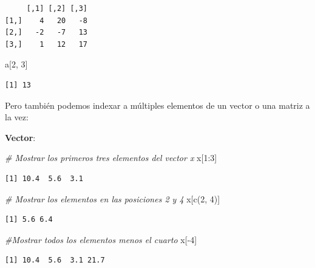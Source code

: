 \documentclass[
]{book}
\newenvironment{Shaded}{\begin{snugshade}}{\end{snugshade}}
\newcommand{\CommentTok}[1]{\textcolor[rgb]{0.56,0.35,0.01}{\textit{#1}}}
\newcommand{\DecValTok}[1]{\textcolor[rgb]{0.00,0.00,0.81}{#1}}
\newcommand{\FunctionTok}[1]{\textcolor[rgb]{0.00,0.00,0.00}{#1}}
\newcommand{\NormalTok}[1]{#1}
\newcommand{\SpecialCharTok}[1]{\textcolor[rgb]{0.00,0.00,0.00}{#1}}
\begin{document}
\begin{verbatim}
     [,1] [,2] [,3]
[1,]    4   20   -8
[2,]   -2   -7   13
[3,]    1   12   17
\end{verbatim}

\begin{Shaded}
\begin{Highlighting}[]
\NormalTok{a[}\DecValTok{2}\NormalTok{, }\DecValTok{3}\NormalTok{]}
\end{Highlighting}
\end{Shaded}

\begin{verbatim}
[1] 13
\end{verbatim}

Pero también podemos indexar a múltiples elementos de un vector o una matriz a la vez:

\textbf{Vector}:

\begin{Shaded}
\begin{Highlighting}[]
\CommentTok{\# Mostrar los primeros tres elementos del vector x}
\NormalTok{x[}\DecValTok{1}\SpecialCharTok{:}\DecValTok{3}\NormalTok{]}
\end{Highlighting}
\end{Shaded}

\begin{verbatim}
[1] 10.4  5.6  3.1
\end{verbatim}

\begin{Shaded}
\begin{Highlighting}[]
\CommentTok{\# Mostrar los elementos en las posiciones 2 y 4}
\NormalTok{x[}\FunctionTok{c}\NormalTok{(}\DecValTok{2}\NormalTok{, }\DecValTok{4}\NormalTok{)]}
\end{Highlighting}
\end{Shaded}

\begin{verbatim}
[1] 5.6 6.4
\end{verbatim}

\begin{Shaded}
\begin{Highlighting}[]
\CommentTok{\#Mostrar todos los elementos menos el cuarto}
\NormalTok{x[}\SpecialCharTok{{-}}\DecValTok{4}\NormalTok{]}
\end{Highlighting}
\end{Shaded}

\begin{verbatim}
[1] 10.4  5.6  3.1 21.7
\end{verbatim}
\end{document}
